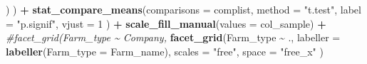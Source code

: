 \documentclass[
]{article}
\newenvironment{Shaded}{\begin{snugshade}}{\end{snugshade}}
\newcommand{\AttributeTok}[1]{\textcolor[rgb]{0.13,0.29,0.53}{#1}}
\newcommand{\CommentTok}[1]{\textcolor[rgb]{0.56,0.35,0.01}{\textit{#1}}}
\newcommand{\DecValTok}[1]{\textcolor[rgb]{0.00,0.00,0.81}{#1}}
\newcommand{\FunctionTok}[1]{\textcolor[rgb]{0.13,0.29,0.53}{\textbf{#1}}}
\newcommand{\NormalTok}[1]{#1}
\newcommand{\SpecialCharTok}[1]{\textcolor[rgb]{0.81,0.36,0.00}{\textbf{#1}}}
\newcommand{\StringTok}[1]{\textcolor[rgb]{0.31,0.60,0.02}{#1}}
\begin{document}
\begin{Shaded}
\begin{Highlighting}[]
\NormalTok{                                  )}
\NormalTok{        ) }\SpecialCharTok{+}
  \FunctionTok{stat\_compare\_means}\NormalTok{(}\AttributeTok{comparisons =}\NormalTok{ complist, }
                     \AttributeTok{method =} \StringTok{"t.test"}\NormalTok{, }
                     \AttributeTok{label =} \StringTok{"p.signif"}\NormalTok{, }
                     \AttributeTok{vjust =} \DecValTok{1}
\NormalTok{                     ) }\SpecialCharTok{+}
  \FunctionTok{scale\_fill\_manual}\NormalTok{(}\AttributeTok{values =}\NormalTok{ col\_sample) }\SpecialCharTok{+}
  \CommentTok{\#facet\_grid(Farm\_type \textasciitilde{} Company,}
  \FunctionTok{facet\_grid}\NormalTok{(Farm\_type }\SpecialCharTok{\textasciitilde{}}\NormalTok{ .,}
             \AttributeTok{labeller =} \FunctionTok{labeller}\NormalTok{(}\AttributeTok{Farm\_type =}\NormalTok{ Farm\_name),}
             \AttributeTok{scales =} \StringTok{"free"}\NormalTok{,}
            \AttributeTok{space =} \StringTok{"free\_x"}
\NormalTok{             )}



\end{Highlighting}
\end{Shaded}
\end{document}
